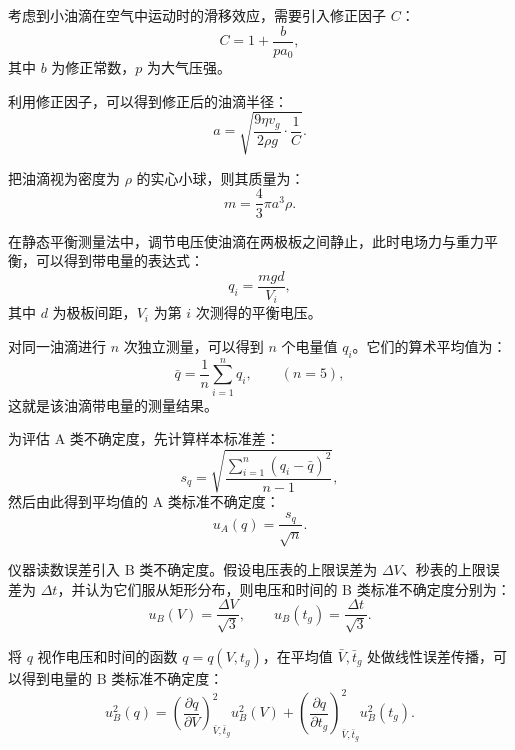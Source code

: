 \documentclass[a4paper,8pt,twocolumn]{article}
\begin{document}
考虑到小油滴在空气中运动时的滑移效应，需要引入修正因子 $C$：
\begin{equation}
  C = 1+\frac{b}{p a_0},
\end{equation}
其中 $b$ 为修正常数，$p$ 为大气压强。

利用修正因子，可以得到修正后的油滴半径：
\begin{equation}
  a = \sqrt{\frac{9\eta v_g}{2\rho g}\cdot\frac{1}{C}}.
\end{equation}

把油滴视为密度为 $\rho$ 的实心小球，则其质量为：
\begin{equation}
  m = \frac{4}{3}\pi a^3 \rho .
\end{equation}

在静态平衡测量法中，调节电压使油滴在两极板之间静止，此时电场力与重力平衡，可以得到带电量的表达式：
\begin{equation}
  q_i = \frac{m g d}{V_i},
\end{equation}
其中 $d$ 为极板间距，$V_i$ 为第 $i$ 次测得的平衡电压。

对同一油滴进行 $n$ 次独立测量，可以得到 $n$ 个电量值 $q_i$。它们的算术平均值为：
\begin{equation}
  \bar q = \frac{1}{n}\sum_{i=1}^n q_i,\qquad (n=5),
\end{equation}
这就是该油滴带电量的测量结果。

为评估 A 类不确定度，先计算样本标准差：
\begin{equation}
  s_q = \sqrt{\frac{\sum_{i=1}^n (q_i-\bar q)^2}{n-1}},
\end{equation}
然后由此得到平均值的 A 类标准不确定度：
\begin{equation}
  u_A(q) = \frac{s_q}{\sqrt{n}}.
\end{equation}

仪器读数误差引入 B 类不确定度。假设电压表的上限误差为 $\Delta V$、秒表的上限误差为 $\Delta t$，并认为它们服从矩形分布，则电压和时间的 B 类标准不确定度分别为：
\begin{equation}
  u_B(V) = \frac{\Delta V}{\sqrt{3}},\qquad
  u_B(t_g) = \frac{\Delta t}{\sqrt{3}}.
\end{equation}

将 $q$ 视作电压和时间的函数 $q=q(V,t_g)$，在平均值 $\bar V,\bar t_g$ 处做线性误差传播，可以得到电量的 B 类标准不确定度：
\begin{equation}
  u_B^2(q)
  = \left(\frac{\partial q}{\partial V}\right)^2_{\bar V,\bar t_g} u_B^2(V)
   + \left(\frac{\partial q}{\partial t_g}\right)^2_{\bar V,\bar t_g} u_B^2(t_g).
\end{equation}
\end{document}
